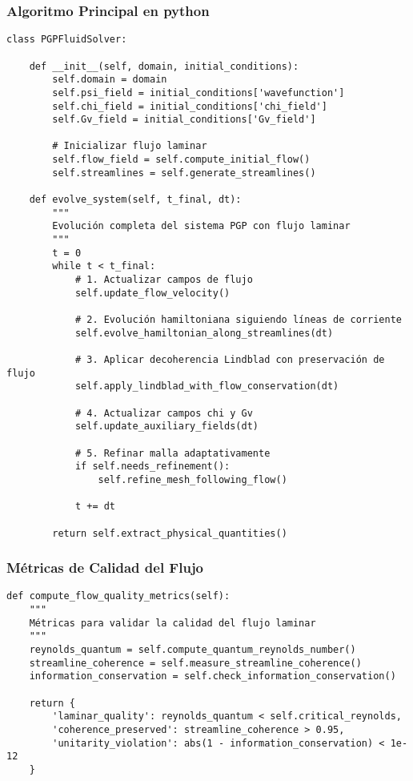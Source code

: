 \documentclass{book}
\begin{document}
\subsubsection*{Algoritmo Principal en python}
\begin{verbatim}
class PGPFluidSolver:

    def __init__(self, domain, initial_conditions):
        self.domain = domain
        self.psi_field = initial_conditions['wavefunction']
        self.chi_field = initial_conditions['chi_field']
        self.Gv_field = initial_conditions['Gv_field']

        # Inicializar flujo laminar
        self.flow_field = self.compute_initial_flow()
        self.streamlines = self.generate_streamlines()

    def evolve_system(self, t_final, dt):
        """
        Evolución completa del sistema PGP con flujo laminar
        """
        t = 0
        while t < t_final:
            # 1. Actualizar campos de flujo
            self.update_flow_velocity()

            # 2. Evolución hamiltoniana siguiendo líneas de corriente
            self.evolve_hamiltonian_along_streamlines(dt)

            # 3. Aplicar decoherencia Lindblad con preservación de flujo
            self.apply_lindblad_with_flow_conservation(dt)

            # 4. Actualizar campos chi y Gv
            self.update_auxiliary_fields(dt)

            # 5. Refinar malla adaptativamente
            if self.needs_refinement():
                self.refine_mesh_following_flow()

            t += dt

        return self.extract_physical_quantities()
\end{verbatim}
\subsubsection*{Métricas de Calidad del Flujo}
\begin{verbatim}
def compute_flow_quality_metrics(self):
    """
    Métricas para validar la calidad del flujo laminar
    """
    reynolds_quantum = self.compute_quantum_reynolds_number()
    streamline_coherence = self.measure_streamline_coherence()
    information_conservation = self.check_information_conservation()

    return {
        'laminar_quality': reynolds_quantum < self.critical_reynolds,
        'coherence_preserved': streamline_coherence > 0.95,
        'unitarity_violation': abs(1 - information_conservation) < 1e-12
    }
\end{verbatim}
\end{document}
